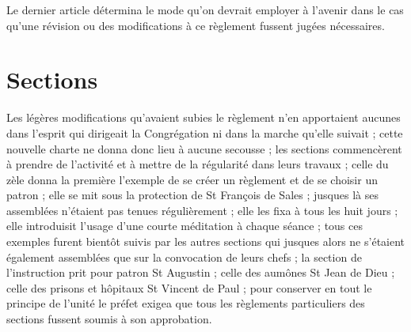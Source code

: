 Le dernier article détermina le mode qu'on devrait employer à l'avenir dans le cas qu'une révision ou des modifications à ce règlement fussent jugées nécessaires.

\section*{Sections}
Les légères modifications qu'avaient subies le règlement n'en apportaient aucunes dans l'esprit qui dirigeait la Congrégation ni dans la marche qu'elle suivait ; cette nouvelle charte ne donna donc lieu à aucune secousse ; les sections commencèrent à prendre de l'activité et à mettre de la régularité dans leurs travaux ; celle du zèle donna la première l'exemple de se créer un règlement et de se choisir un patron ; elle se mit sous la protection de St François de Sales ; jusques là ses assemblées n'étaient pas tenues régulièrement ; elle les fixa à tous les huit jours ; elle introduisit l'usage d'une courte méditation
à chaque séance ; tous ces exemples furent bientôt suivis par les autres sections qui jusques alors ne s'étaient également assemblées que sur la convocation de leurs chefs ; la section de l'instruction prit pour patron St Augustin ; celle des aumônes St Jean de Dieu ; celle des prisons et hôpitaux St Vincent de Paul ; pour conserver en tout le principe de l'unité le préfet exigea que tous les règlements particuliers des sections fussent soumis à son approbation.

